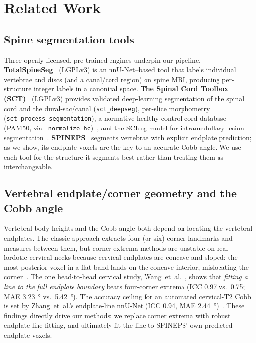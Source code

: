 \section{Related Work}
\label{sec:related}

\subsection{Spine segmentation tools}
Three openly licensed, pre-trained engines underpin our pipeline.
\textbf{TotalSpineSeg}~\cite{totalspineseg} (LGPLv3) is an nnU-Net--based tool that labels individual
vertebrae and discs (and a canal/cord region) on spine MRI, producing per-structure integer labels in a
canonical space. \textbf{The Spinal Cord Toolbox (SCT)}~\cite{sct} (LGPLv3) provides validated
deep-learning segmentation of the spinal cord and the dural-sac/canal (\texttt{sct\_deepseg}), per-slice
morphometry (\texttt{sct\_process\_segmentation}), a normative healthy-control cord database
(PAM50, via \texttt{-normalize-hc})~\cite{valosek2024}, and the SCIseg model for intramedullary
lesion segmentation~\cite{sciseg2024}. \textbf{SPINEPS}~\cite{spineps} segments vertebrae with explicit
endplate prediction; as we show, its endplate voxels are the key to an accurate Cobb angle. We use each
tool for the structure it segments best rather than treating them as interchangeable.

\subsection{Vertebral endplate/corner geometry and the Cobb angle}
Vertebral-body heights and the Cobb angle both depend on locating the vertebral endplates. The classic
approach extracts four (or six) corner landmarks and measures between them, but corner-extrema methods are
unstable on real lordotic cervical necks because cervical endplates are concave and sloped: the
most-posterior voxel in a flat band lands on the concave interior, mislocating the corner~\cite{chen2013}.
The one head-to-head cervical study, Wang~et~al.~\cite{wang2023}, shows that \emph{fitting a line to the
full endplate boundary} beats four-corner extrema (ICC 0.97 vs.\ 0.75; MAE \SI{3.23}{\degree} vs.\
\SI{5.42}{\degree}). The accuracy ceiling for an automated cervical-T2 Cobb is set by Zhang~et~al.'s
endplate-line nnU-Net (ICC 0.94, MAE \SI{2.44}{\degree})~\cite{zhang2025}. These findings directly drive
our methods: we replace corner extrema with robust endplate-line fitting, and ultimately fit the line to
SPINEPS' own predicted endplate voxels.

